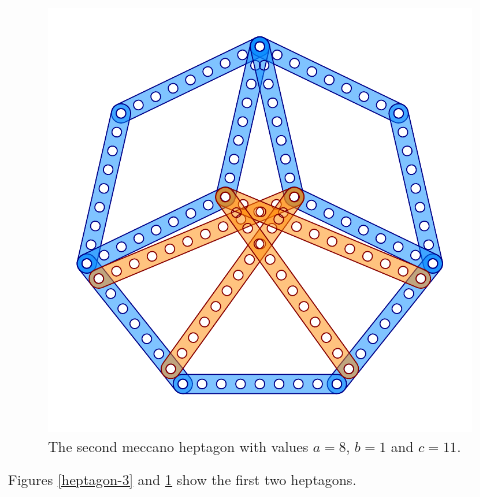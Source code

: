 \documentclass[11pt]{article}
\begin{document}
\begin{figure}[htp]
\centering
\includegraphics[scale=1]{figs/heptagon-8}
\caption{The second meccano heptagon with values $a=8$, $b=1$ and $c=11$.}
\label{heptagon-8}
\end{figure}

Figures \ref{heptagon-3} and \ref{heptagon-8} show the first two heptagons.
\end{document}
